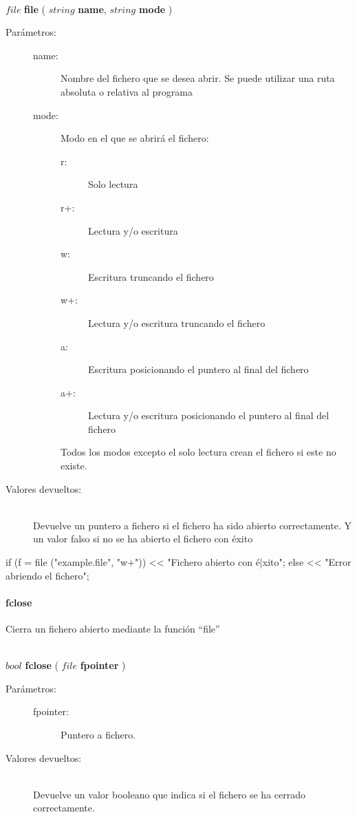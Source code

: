 \begin{framed}
\hfill \\ $file$ \textbf{file} ( $string$ \textbf{name}, $string$ \textbf{mode}  )  
\begin{description}
\item [Parámetros:] \hfill 
   \begin{description}
   \item[name:] Nombre del fichero que se desea abrir. Se puede utilizar una ruta absoluta o relativa al programa
   \item[mode:] Modo en el que se abrirá el fichero:
      \begin{description}
         \item [r:] Solo lectura
         \item [r+:] Lectura y/o escritura
         \item [w:] Escritura truncando el fichero
         \item [w+:] Lectura y/o escritura truncando el fichero
         \item [a:] Escritura posicionando el puntero al final del fichero
         \item [a+:] Lectura y/o escritura posicionando el puntero al final del fichero
      \end{description} \hfill 
      
      Todos los modos excepto el solo lectura crean el fichero si este no existe. 
   \end{description}
\item[Valores devueltos:] \hfill \\
   Devuelve un puntero a fichero si el fichero ha sido abierto correctamente. Y un valor falso si no se ha 
   abierto el fichero con éxito
\end{description}
\end{framed}

\begin{myverbatim}  
   if (f = file ("example.file", "w+")){
      << "Fichero abierto con é|xito";
   } else {
      << "Error abriendo el fichero";
   }
\end{myverbatim}

\paragraph{fclose}
Cierra un fichero abierto mediante la función ``file''

\begin{framed}
\hfill \\ $bool$ \textbf{fclose} ( $file$ \textbf{fpointer}  )  
\begin{description}
\item [Parámetros:] \hfill 
   \begin{description}
   \item[fpointer:] Puntero a fichero. 
   \end{description}
\item[Valores devueltos:] \hfill \\
   Devuelve un valor booleano que indica si el fichero se ha cerrado correctamente.
\end{description}
\end{framed}

